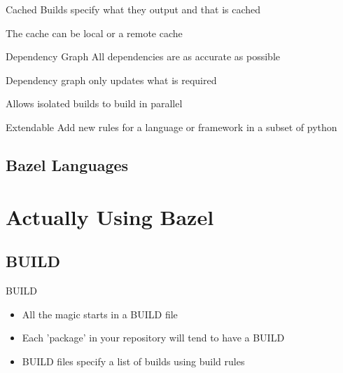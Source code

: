 \documentclass[aspectratio=169]{beamer}
\begin{document}
\begin{body-slide}{Cached}
Builds specify what they output and that is cached

The cache can be local or a remote cache
\end{body-slide}

\begin{body-slide}{Dependency Graph}
All dependencies are as accurate as possible

Dependency graph only updates what is required

Allows isolated builds to build in parallel
\end{body-slide}

\begin{body-slide}{Extendable}
Add new rules for a language or framework in a subset of python
\end{body-slide}

\subsection{Bazel Languages}
{
\begin{frame}
    
\end{frame}
}


\section{Actually Using Bazel}

\subsection{BUILD}

\begin{body-slide}{BUILD}
\begin{itemize}[<+-| alert@+>]
    \color{UQCSBlue}
    \item All the magic starts in a BUILD file
    \item Each 'package' in your repository will tend to have a BUILD
    \item BUILD files specify a list of builds using build rules
\end{itemize}
\end{body-slide}
\end{document}
